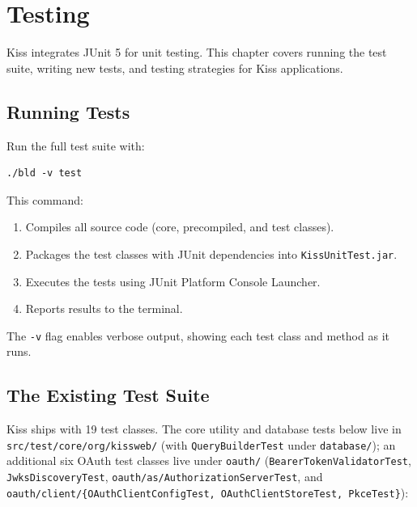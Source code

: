\chapter{Testing}
\label{ch:testing}

Kiss integrates JUnit 5 for unit testing.  This chapter covers running the test suite, writing new tests, and testing strategies for Kiss applications.

\section{Running Tests}
\label{sec:test-running}

Run the full test suite with:

\begin{lstlisting}[style=shell]
./bld -v test
\end{lstlisting}

\noindent
This command:

\begin{enumerate}
  \item Compiles all source code (core, precompiled, and test classes).
  \item Packages the test classes with JUnit dependencies into \texttt{KissUnitTest.jar}.
  \item Executes the tests using JUnit Platform Console Launcher.
  \item Reports results to the terminal.
\end{enumerate}

\noindent
The \texttt{-v} flag enables verbose output, showing each test class and method as it runs.

\section{The Existing Test Suite}
\label{sec:test-existing}

Kiss ships with 19 test classes.  The core utility and database tests below live in \texttt{src/test/core/org/kissweb/} (with \texttt{QueryBuilderTest} under \texttt{database/}); an additional six OAuth test classes live under \texttt{oauth/} (\texttt{BearerTokenValidatorTest}, \texttt{JwksDiscoveryTest}, \texttt{oauth/as/AuthorizationServerTest}, and \texttt{oauth/client/\{OAuthClientConfigTest, OAuthClientStoreTest, PkceTest\}}):

